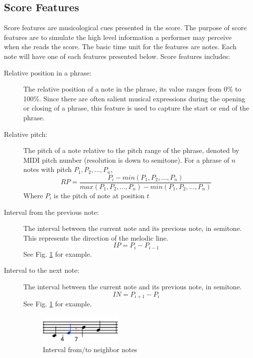 \subsection{Score Features}
      Score features are musicological cues presented in the score. The purpose of score features are to simulate the high level information a performer may perceive when she reads the score. The basic time unit for the features are notes. Each note will have one of each features presented below.
      Score features includes:
      \begin{description}
         \item [Relative position in a phrase:]
            The relative position of a note in the phrase, its value ranges from 0\% to 100\%. Since there are often salient musical expressions during the opening or closing of a phrase, this feature is used to capture the start or end of the phrase.
         \item [Relative pitch:]
            The pitch of a note relative to the pitch range of the phrase, denoted by MIDI pitch number (resolution is down to semitone). For a phrase of $n$ notes with pitch $P_1, P_2, \dots, P_n$, $$RP = \frac{P_i -min(P_1, P_2, \dots, P_n) }{max(P_1, P_2, \dots, P_n)-min(P_1, P_2, \dots, P_n) }$$  Where $P_i$ is the pitch of note at position $t$

         \item [Interval from the previous note:] The interval between the current note and its previous note, in semitone. This represents the direction of the melodic line. $$IP = P_{i} - P_{i-1} $$ See Fig. \ref{fig:interval} for example.
         \item [Interval to the next note:] The interval between the current note and its previous note, in semitone. $$IN = P_{i+1} - P_i$$ See Fig. \ref{fig:interval} for example.
         
      \begin{figure}[tp]
         \begin{center}
            \includegraphics[width=0.4\textwidth]{fig/interval_arrow}
         \end{center}
         \caption{Interval from/to neighbor notes}
         \label{fig:interval}
      \end{figure}


\end{description}
